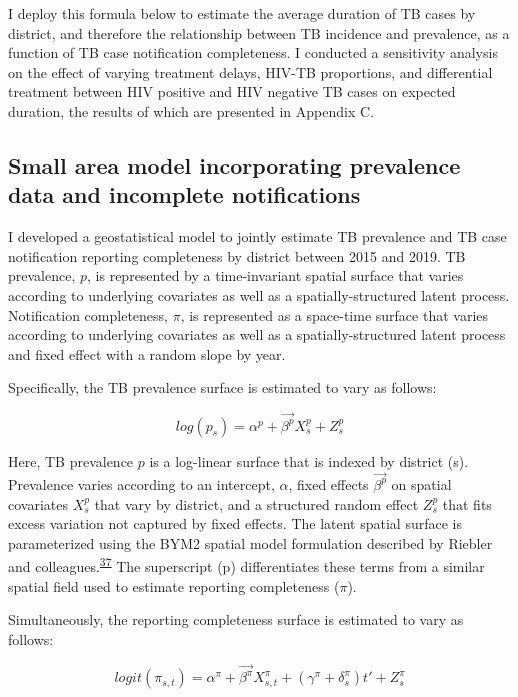 \documentclass[
]{article}
\begin{document}
I deploy this formula below to estimate the average duration of TB cases by district, and therefore the relationship between TB incidence and prevalence, as a function of TB case notification completeness. I conducted a sensitivity analysis on the effect of varying treatment delays, HIV-TB proportions, and differential treatment between HIV positive and HIV negative TB cases on expected duration, the results of which are presented in Appendix C.

\hypertarget{small-area-model-incorporating-prevalence-data-and-incomplete-notifications}{%
\subsection{Small area model incorporating prevalence data and incomplete notifications}\label{small-area-model-incorporating-prevalence-data-and-incomplete-notifications}}

I developed a geostatistical model to jointly estimate TB prevalence and TB case notification reporting completeness by district between 2015 and 2019. TB prevalence, \(p\), is represented by a time-invariant spatial surface that varies according to underlying covariates as well as a spatially-structured latent process. Notification completeness, \(\pi\), is represented as a space-time surface that varies according to underlying covariates as well as a spatially-structured latent process and fixed effect with a random slope by year.

Specifically, the TB prevalence surface is estimated to vary as follows:

\[log(p_s) = \alpha^p + \overrightarrow{\beta^p}X^p_s + Z^p_s\]

Here, TB prevalence \(p\) is a log-linear surface that is indexed by district (s). Prevalence varies according to an intercept, \(\alpha\), fixed effects \(\overrightarrow{\beta^p}\) on spatial covariates \(X^p_s\) that vary by district, and a structured random effect \(Z^p_s\) that fits excess variation not captured by fixed effects. The latent spatial surface is parameterized using the BYM2 spatial model formulation described by Riebler and colleagues.\textsuperscript{\protect\hyperlink{ref-Riebler2016}{37}} The superscript (p) differentiates these terms from a similar spatial field used to estimate reporting completeness (\(\pi\)).

Simultaneously, the reporting completeness surface is estimated to vary as follows:

\[logit(\pi_{s,t}) = \alpha^\pi + \overrightarrow{\beta^\pi}X^\pi_{s,t} + (\gamma^\pi + \delta^\pi_s)t' + Z^\pi_s\]
\end{document}
